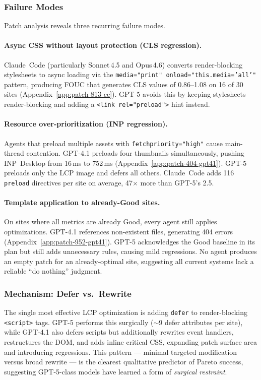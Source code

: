 \subsubsection{Failure Modes}
\label{sec:failure-modes}

Patch analysis reveals three recurring failure modes.

\paragraph{Async CSS without layout protection (CLS regression).}
Claude~Code (particularly Sonnet\,4.5 and Opus\,4.6) converts render-blocking stylesheets to async loading via the \texttt{media="print" onload="this.media='all'"} pattern, producing FOUC that generates CLS values of 0.86--1.08 on 16 of 30 sites (Appendix~\ref{app:patch-813-cc}). GPT-5 avoids this by keeping stylesheets render-blocking and adding a \texttt{<link rel="preload">} hint instead.

\paragraph{Resource over-prioritization (INP regression).}
Agents that preload multiple assets with \texttt{fetchpriority="high"} cause main-thread contention. GPT-4.1 preloads four thumbnails simultaneously, pushing INP~Desktop from 16\,ms to 752\,ms (Appendix~\ref{app:patch-404-gpt41}). GPT-5 preloads only the LCP image and defers all others. Claude~Code adds 116 \texttt{preload} directives per site on average, 47$\times$ more than GPT-5's 2.5.

\paragraph{Template application to already-Good sites.}
On sites where all metrics are already Good, every agent still applies optimizations. GPT-4.1 references non-existent files, generating 404 errors (Appendix~\ref{app:patch-952-gpt41}). GPT-5 acknowledges the Good baseline in its plan but still adds unnecessary rules, causing mild regressions. No agent produces an empty patch for an already-optimal site, suggesting all current systems lack a reliable ``do nothing'' judgment.

\subsubsection{Mechanism: Defer vs.\ Rewrite}

The single most effective LCP optimization is adding \texttt{defer} to render-blocking \texttt{<script>} tags. GPT-5 performs this surgically (${\sim}$9 defer attributes per site), while GPT-4.1 also defers scripts but additionally rewrites event handlers, restructures the DOM, and adds inline critical CSS, expanding patch surface area and introducing regressions. This pattern --- minimal targeted modification versus broad rewrite --- is the clearest qualitative predictor of Pareto success, suggesting GPT-5-class models have learned a form of \emph{surgical restraint}.
